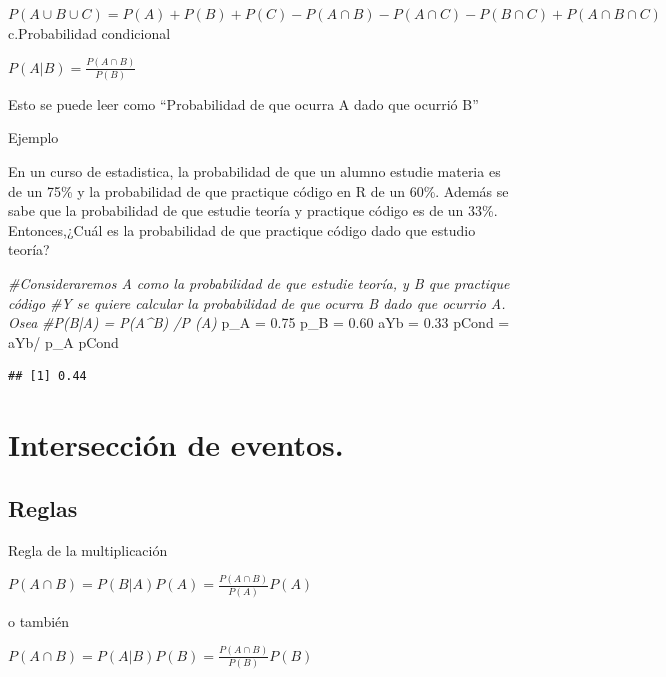 \documentclass[
]{article}
\newenvironment{Shaded}{\begin{snugshade}}{\end{snugshade}}
\newcommand{\CommentTok}[1]{\textcolor[rgb]{0.56,0.35,0.01}{\textit{#1}}}
\newcommand{\FloatTok}[1]{\textcolor[rgb]{0.00,0.00,0.81}{#1}}
\newcommand{\NormalTok}[1]{#1}
\newcommand{\OtherTok}[1]{\textcolor[rgb]{0.56,0.35,0.01}{#1}}
\newcommand{\SpecialCharTok}[1]{\textcolor[rgb]{0.00,0.00,0.00}{#1}}
\begin{document}
\(P(A \cup B \cup C ) = P(A) + P(B) + P(C) - P(A \cap B) - P(A\cap C ) - P(B \cap C) + P(A \cap B \cap C)\)
{ c.Probabilidad condicional }

\(P(A|B) = \frac{P(A \cap B)}{P(B)}\)

Esto se puede leer como ``Probabilidad de que ocurra A dado que ocurrió
B''

Ejemplo

En un curso de estadistica, la probabilidad de que un alumno estudie
materia es de un 75\% y la probabilidad de que practique código en R de
un 60\%. Además se sabe que la probabilidad de que estudie teoría y
practique código es de un 33\%. Entonces,¿Cuál es la probabilidad de que
practique código dado que estudio teoría?

\begin{Shaded}
\begin{Highlighting}[]
\CommentTok{\#Consideraremos A como  la probabilidad de que estudie teoría, y B que practique código}
\CommentTok{\#Y se quiere calcular la probabilidad de que ocurra B dado que ocurrio A. Osea}
\CommentTok{\#P(B|A) = P(A\^{}B) /P (A)}
\NormalTok{p\_A }\OtherTok{=} \FloatTok{0.75}
\NormalTok{p\_B }\OtherTok{=} \FloatTok{0.60}
\NormalTok{aYb }\OtherTok{=} \FloatTok{0.33}
\NormalTok{pCond }\OtherTok{=}\NormalTok{ aYb}\SpecialCharTok{/}\NormalTok{ p\_A}
\NormalTok{pCond}
\end{Highlighting}
\end{Shaded}

\begin{verbatim}
## [1] 0.44
\end{verbatim}

\hypertarget{intersecciuxf3n-de-eventos.}{%
\section{Intersección de eventos.}\label{intersecciuxf3n-de-eventos.}}

\hypertarget{reglas}{%
\subsection{Reglas}\label{reglas}}

{ Regla de la multiplicación }

\(P(A \cap B) = P(B|A) P(A) = \frac{P(A\cap B)}{P(A)} P(A)\)

o también

\(P(A \cap B) = P(A|B) P(B) = \frac{P(A\cap B)}{P(B)} P(B)\)
\end{document}
